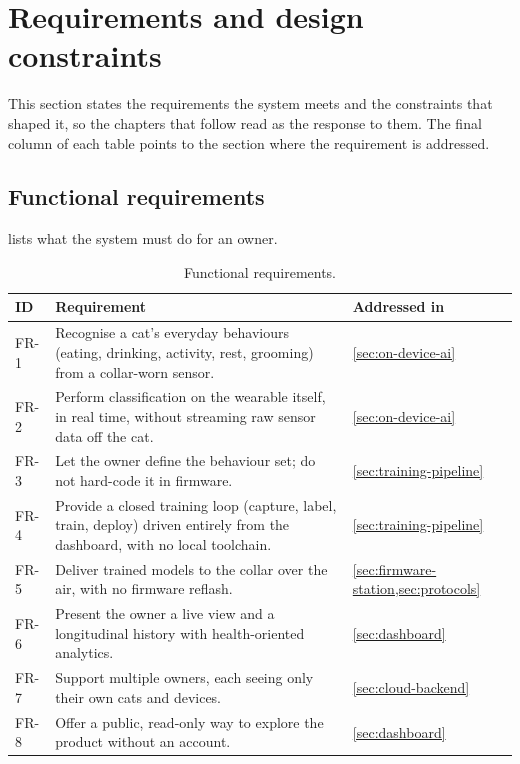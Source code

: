 \section{Requirements and design constraints}
\label{sec:requirements}

This section states the requirements the system meets and the constraints that shaped it, so the
chapters that follow read as the response to them. The final column of each table points to the
section where the requirement is addressed.

\subsection{Functional requirements}

 lists what the system must do for an owner.

\begin{table}[ht]
  \centering
  \caption{Functional requirements.}
  \label{tab:fr}
  \begin{tabularx}{\textwidth}{@{}l X l@{}}
    \toprule
    \textbf{ID} & \textbf{Requirement} & \textbf{Addressed in} \\
    \midrule
    FR-1 & Recognise a cat's everyday behaviours (eating, drinking, activity, rest, grooming) from a
           collar-worn sensor. & \cref{sec:on-device-ai} \\
    FR-2 & Perform classification on the wearable itself, in real time, without streaming raw sensor
           data off the cat. & \cref{sec:on-device-ai} \\
    FR-3 & Let the owner define the behaviour set; do not hard-code it in firmware. &
           \cref{sec:training-pipeline} \\
    FR-4 & Provide a closed training loop (capture, label, train, deploy) driven entirely from the
           dashboard, with no local toolchain. & \cref{sec:training-pipeline} \\
    FR-5 & Deliver trained models to the collar over the air, with no firmware reflash. &
           \cref{sec:firmware-station,sec:protocols} \\
    FR-6 & Present the owner a live view and a longitudinal history with health-oriented analytics. &
           \cref{sec:dashboard} \\
    FR-7 & Support multiple owners, each seeing only their own cats and devices. &
           \cref{sec:cloud-backend} \\
    FR-8 & Offer a public, read-only way to explore the product without an account. &
           \cref{sec:dashboard} \\
    \bottomrule
  \end{tabularx}
\end{table}

